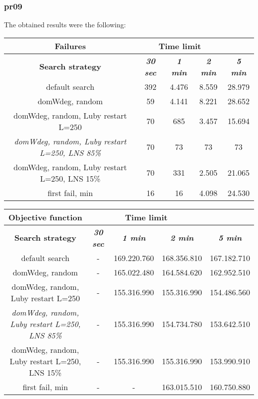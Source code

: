 \subsubsection{pr09}
The obtained results were the following:
{
\renewcommand{\arraystretch}{2}
\begin{longtable}[h]{| c | c | c | c | c |}
    \hline
    \textbf{Failures} & \multicolumn{3}{c}{Time limit} & \\
    \hline
    \textbf{Search strategy} & \textbf{\textit{30 sec}} & \textbf{\textit{1 min}} & \textbf{\textit{2 min}} & \textbf{\textit{5 min}} \\
    \hline
    \endhead
    default search                                         & 392 & 4.476 & 8.559 & 28.979 \\
    \hline
    domWdeg, random                                        &  59 & 4.141 & 8.221 & 28.652 \\
    \hline
    domWdeg, random, Luby restart L=250                    &  70 &  685 & 3.457 & 15.694 \\
    \hline
    \textit{domWdeg, random, Luby restart L=250, LNS 85\%} &  70 &   73 &   73 &    73 \\
    \hline
    domWdeg, random, Luby restart L=250, LNS 15\%          &  70 &  331 & 2.505 &  21.065 \\
    \hline
    first fail, min                                        &  16 &   16 & 4.098 &  24.530 \\
    \hline
\end{longtable}
}

{
\renewcommand{\arraystretch}{2}
\begin{longtable}[h]{| c | c | c | c | c |}
    \hline
    \textbf{Objective function} & \multicolumn{3}{c}{Time limit} & \\
    \hline
    \textbf{Search strategy} & \textbf{\textit{30 sec}} & \textbf{\textit{1 min}} & \textbf{\textit{2 min}} & \textbf{\textit{5 min}} \\
    \hline
    \endhead
    default search                                         & - & 169.220.760 & 168.356.810 & 167.182.710 \\
    \hline
    domWdeg, random                                        & - & 165.022.480 & 164.584.620 & 162.952.510 \\
    \hline
    domWdeg, random, Luby restart L=250                    & - & 155.316.990 & 155.316.990 & 154.486.560 \\
    \hline
    \textit{domWdeg, random, Luby restart L=250, LNS 85\%} & - & 155.316.990 & 154.734.780 & 153.642.510 \\
    \hline
    domWdeg, random, Luby restart L=250, LNS 15\%          & - & 155.316.990 & 155.316.990 & 153.990.910 \\
    \hline
    first fail, min                                        & - &         - & 163.015.510 & 160.750.880 \\
    \hline
\end{longtable}
}
